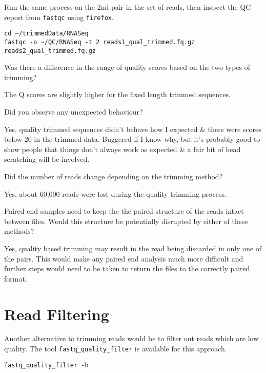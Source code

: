 \begin{steps}
Run the same process on the 2nd pair in the set of reads, then inspect the QC report from \texttt{fastqc} using \texttt{firefox}.
\begin{lstlisting}
cd ~/trimmedData/RNASeq
fastqc -o ~/QC/RNASeq -t 2 reads1_qual_trimmed.fq.gz reads2_qual_trimmed.fq.gz
\end{lstlisting}
\end{steps}

\begin{questions}
Was there a difference in the range of quality scores based on the two types of trimming? \\
\begin{answer}
The Q scores are slightly higher for the fixed length trimmed sequences. \\
\end{answer}

Did you observe any unexpected behaviour? \\
\begin{answer}
Yes, quality trimmed sequences didn't behave how I expected \& there were scores below 20 in the trimmed data.
Buggered if I know why, but it's probably good to show people that things don't always work as expected \& a fair bit of head scratching will be involved. \\
\end{answer}

Did the number of reads change depending on the trimming method? \\
\begin{answer}
Yes, about 60,000 reads were lost during the quality trimming process. \\
\end{answer}

Paired end samples need to keep the the paired structure of the reads intact between files.
Would this structure be potentially disrupted by either of these methods? \\
\begin{answer}
Yes, quality based trimming may result in the read being discarded in only one of the pairs. 
This would make any paired end analysis much more difficult and further steps would need to be taken to return the files to the correctly paired format.\\
\end{answer}
\end{questions}

\section{Read Filtering}
Another alternative to trimming reads would be to filter out reads which are low quality.
The tool \texttt{fastq_quality_filter} is available for this approach.
\begin{lstlisting}
fastq_quality_filter -h
\end{lstlisting}

